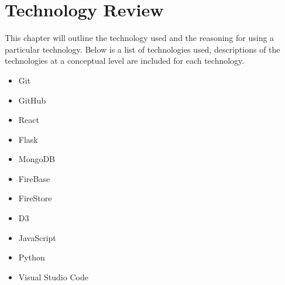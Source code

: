 \chapter{Technology Review}
This chapter will outline the technology used and the reasoning for using a particular technology. Below is a list of technologies used, descriptions of the technologies at a conceptual level are included for each technology.
\begin{itemize}
\item Git
\item GitHub
\item React
\item Flask
\item MongoDB
\item FireBase
\item FireStore
\item D3
\item JavaScript
\item Python
\item Visual Studio Code


\end{itemize}

